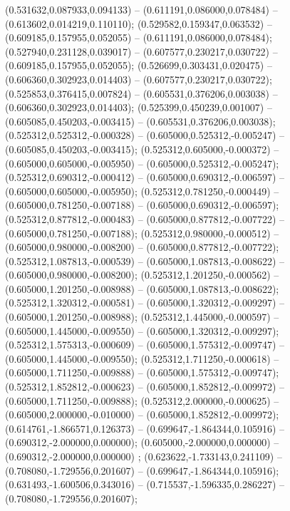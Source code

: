  (0.531632,0.087933,0.094133) -- (0.611191,0.086000,0.078484) -- (0.613602,0.014219,0.110110);
 (0.529582,0.159347,0.063532) -- (0.609185,0.157955,0.052055) -- (0.611191,0.086000,0.078484);
 (0.527940,0.231128,0.039017) -- (0.607577,0.230217,0.030722) -- (0.609185,0.157955,0.052055);
 (0.526699,0.303431,0.020475) -- (0.606360,0.302923,0.014403) -- (0.607577,0.230217,0.030722);
 (0.525853,0.376415,0.007824) -- (0.605531,0.376206,0.003038) -- (0.606360,0.302923,0.014403);
 (0.525399,0.450239,0.001007) -- (0.605085,0.450203,-0.003415) -- (0.605531,0.376206,0.003038);
 (0.525312,0.525312,-0.000328) -- (0.605000,0.525312,-0.005247) -- (0.605085,0.450203,-0.003415);
 (0.525312,0.605000,-0.000372) -- (0.605000,0.605000,-0.005950) -- (0.605000,0.525312,-0.005247);
 (0.525312,0.690312,-0.000412) -- (0.605000,0.690312,-0.006597) -- (0.605000,0.605000,-0.005950);
 (0.525312,0.781250,-0.000449) -- (0.605000,0.781250,-0.007188) -- (0.605000,0.690312,-0.006597);
 (0.525312,0.877812,-0.000483) -- (0.605000,0.877812,-0.007722) -- (0.605000,0.781250,-0.007188);
 (0.525312,0.980000,-0.000512) -- (0.605000,0.980000,-0.008200) -- (0.605000,0.877812,-0.007722);
 (0.525312,1.087813,-0.000539) -- (0.605000,1.087813,-0.008622) -- (0.605000,0.980000,-0.008200);
 (0.525312,1.201250,-0.000562) -- (0.605000,1.201250,-0.008988) -- (0.605000,1.087813,-0.008622);
 (0.525312,1.320312,-0.000581) -- (0.605000,1.320312,-0.009297) -- (0.605000,1.201250,-0.008988);
 (0.525312,1.445000,-0.000597) -- (0.605000,1.445000,-0.009550) -- (0.605000,1.320312,-0.009297);
 (0.525312,1.575313,-0.000609) -- (0.605000,1.575312,-0.009747) -- (0.605000,1.445000,-0.009550);
 (0.525312,1.711250,-0.000618) -- (0.605000,1.711250,-0.009888) -- (0.605000,1.575312,-0.009747);
 (0.525312,1.852812,-0.000623) -- (0.605000,1.852812,-0.009972) -- (0.605000,1.711250,-0.009888);
 (0.525312,2.000000,-0.000625) -- (0.605000,2.000000,-0.010000) -- (0.605000,1.852812,-0.009972);
 (0.614761,-1.866571,0.126373) -- (0.699647,-1.864344,0.105916) -- (0.690312,-2.000000,0.000000);
 (0.605000,-2.000000,0.000000) -- (0.690312,-2.000000,0.000000) ;
 (0.623622,-1.733143,0.241109) -- (0.708080,-1.729556,0.201607) -- (0.699647,-1.864344,0.105916);
 (0.631493,-1.600506,0.343016) -- (0.715537,-1.596335,0.286227) -- (0.708080,-1.729556,0.201607);
